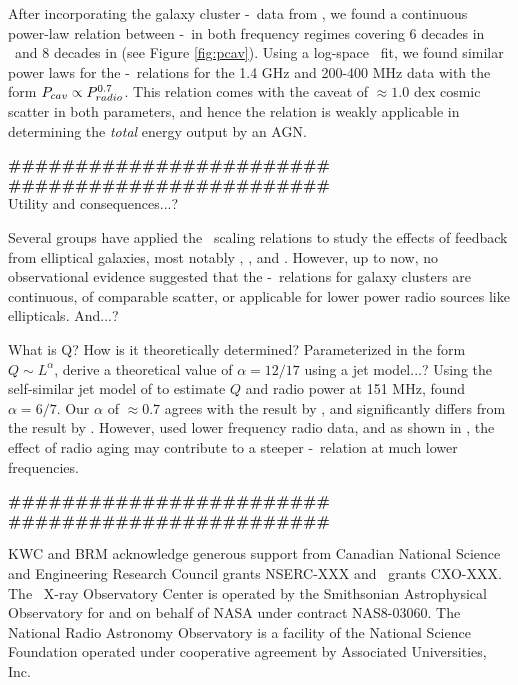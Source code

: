 \documentclass{emulateapj}
\begin{document}
After incorporating the galaxy cluster \pcav-\prad\ data from
\citep{birzan08}, we found a continuous power-law relation between
\pcav-\prad\ in both frequency regimes covering 6 decades in
\prad\ and 8 decades in \pcav (see Figure \ref{fig:pcav}). Using a
log-space \bces\ fit, we found similar power laws for the
\pcav-\prad\ relations for the 1.4 GHz and 200-400 MHz data with the
form $P_{cav} \propto P_{radio}^{0.7}$. This relation comes with the caveat
of $\approx 1.0$ dex cosmic scatter in both parameters, and hence the
relation is weakly applicable in determining the {\it{total}} energy
output by an AGN.

{\bfseries{\#\#\#\#\#\#\#\#\#\#\#\#\#\#\#\#\#\#\#\#\#\#\#\#}}\\
{\bfseries{\#\#\#\#\#\#\#\#\#\#\#\#\#\#\#\#\#\#\#\#\#\#\#\#}}\\

Utility and consequences...?

Several groups have applied the \birzan\ scaling relations to study
the effects of feedback from elliptical galaxies, most notably
\citet{best07}, \citet{2007MNRAS.379..260M}, and
\citet{2009arXiv0908.3158H}. However, up to now, no observational
evidence suggested that the \pjet-\prad\ relations for galaxy clusters
are continuous, of comparable scatter, or applicable for lower power
radio sources like ellipticals. And...?

What is Q? How is it theoretically determined? Parameterized in the
form $Q \sim L^{\alpha}$, \citet{1979ApJ...232...34B} derive a
theoretical value of $\alpha = 12/17$ using a jet model...? Using the
self-similar jet model of \citet{1991MNRAS.250..581F} to estimate $Q$
and radio power at 151 MHz, \citet{1999MNRAS.309.1017W} found $\alpha
= 6/7$. Our $\alpha$ of $\approx 0.7$ agrees with the result by
\citet{1979ApJ...232...34B}, and significantly differs from the result
by \citet{1999MNRAS.309.1017W}. However, \citet{1999MNRAS.309.1017W}
used lower frequency radio data, and as shown in \citet{birzan08}, the
effect of radio aging may contribute to a steeper
\pjet-\prad\ relation at much lower frequencies.

{\bfseries{\#\#\#\#\#\#\#\#\#\#\#\#\#\#\#\#\#\#\#\#\#\#\#\#}}\\
{\bfseries{\#\#\#\#\#\#\#\#\#\#\#\#\#\#\#\#\#\#\#\#\#\#\#\#}}\\

\acknowledgements

KWC and BRM acknowledge generous support from Canadian National
Science and Engineering Research Council grants NSERC-XXX and
\cxo\ grants CXO-XXX. The \chandra\ X-ray Observatory Center is
operated by the Smithsonian Astrophysical Observatory for and on
behalf of NASA under contract NAS8-03060. The National Radio Astronomy
Observatory is a facility of the National Science Foundation operated
under cooperative agreement by Associated Universities, Inc.
\end{document}
